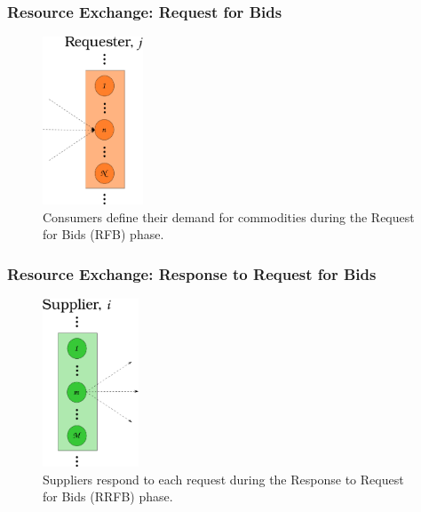 

  

\begin{frame}[ctb!]
  \frametitle{Resource Exchange: Request for Bids}
  \begin{figure}
    \includegraphics[height=5cm]{./images/requester.eps}
    \caption{Consumers define their demand for commodities during the Request
      for Bids (RFB) phase.}
  \end{figure}
\end{frame}

\begin{frame}[ctb!]
  \frametitle{Resource Exchange: Response to Request for Bids}
  \begin{figure}
    \includegraphics[height=5cm]{./images/supplier.eps}
    \caption{Suppliers respond to each request during the Response to Request
      for Bids (RRFB) phase.}
  \end{figure}
\end{frame}

